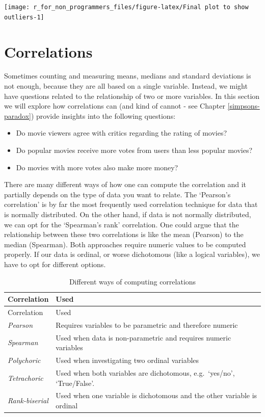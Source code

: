 \documentclass[
]{book}
\begin{document}
\begin{center}\texttt{[image: r\_for\_non\_programmers\_files/figure-latex/Final plot to show outliers-1]} \end{center}

\hypertarget{correlations}{%
\chapter{Correlations}\label{correlations}}

Sometimes counting and measuring means, medians and standard deviations is not enough, because they are all based on a single variable. Instead, we might have questions related to the relationship of two or more variables. In this section we will explore how correlations can (and kind of cannot - see Chapter \ref{simpsons-paradox}) provide insights into the following questions:

\begin{itemize}
\item
  Do movie viewers agree with critics regarding the rating of movies?
\item
  Do popular movies receive more votes from users than less popular movies?
\item
  Do movies with more votes also make more money?
\end{itemize}

There are many different ways of how one can compute the correlation and it partially depends on the type of data you want to relate. The `Pearson's correlation' is by far the most frequently used correlation technique for data that is normally distributed. On the other hand, if data is not normally distributed, we can opt for the `Spearman's rank' correlation. One could argue that the relationship between these two correlations is like the mean (Pearson) to the median (Spearman). Both approaches require numeric values to be computed properly. If our data is ordinal, or worse dichotomous (like a logical variables), we have to opt for different options.

\begin{longtable}[]{@{}
  >{\raggedright\arraybackslash}p{}
  >{\raggedright\arraybackslash}p{}@{}}
\caption{\label{tab:different-correlations} Different ways of computing correlations}\tabularnewline
\toprule
Correlation & Used \\
\midrule
\endfirsthead
\toprule
Correlation & Used \\
\midrule
\endhead
\emph{Pearson} & Requires variables to be parametric and therefore numeric \\
\emph{Spearman} & Used when data is non-parametric and requires numeric variables \\
\emph{Polychoric} & Used when investigating two ordinal variables \\
\emph{Tetrachoric} & Used when both variables are dichotomous, e.g.~`yes/no', `True/False'. \\
\emph{Rank-biserial} & Used when one variable is dichotomous and the other variable is ordinal \\
\bottomrule
\end{longtable}
\end{document}
